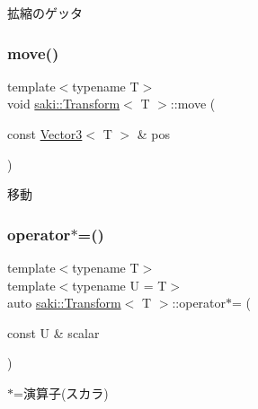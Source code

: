 拡縮のゲッタ 

\mbox{\label{classsaki_1_1_transform_a1c0f7ad966d8f4d014e6f023943bbfb7}} 
\subsubsection{\texorpdfstring{move()}{move()}}
{\footnotesize\ttfamily template$<$typename T$>$ \\
void \mbox{\hyperlink{classsaki_1_1_transform}{saki\+::\+Transform}}$<$ T $>$\+::move (\begin{DoxyParamCaption}\item[{const \mbox{\hyperlink{classsaki_1_1_vector3}{Vector3}}$<$ T $>$ \&}]{pos }\end{DoxyParamCaption})\hspace{0.3cm}{\ttfamily [inline]}}



移動 

\mbox{\label{classsaki_1_1_transform_ab8df7cf8619c1f245d871e4e7627bf78}} 
\subsubsection{\texorpdfstring{operator$\ast$=()}{operator*=()}}
{\footnotesize\ttfamily template$<$typename T$>$ \\
template$<$typename U  = T$>$ \\
auto \mbox{\hyperlink{classsaki_1_1_transform}{saki\+::\+Transform}}$<$ T $>$\+::operator$\ast$= (\begin{DoxyParamCaption}\item[{const U \&}]{scalar }\end{DoxyParamCaption})\hspace{0.3cm}{\ttfamily [inline]}}



$\ast$=演算子(スカラ) 

\mbox{\label{classsaki_1_1_transform_a52201fc4aed19cc0459dc4b3c21c3d37}} 
